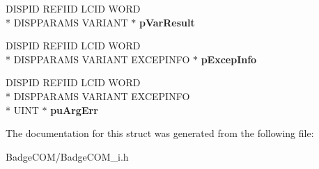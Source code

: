 \begin{DoxyCompactItemize}
\item 
\hypertarget{struct_i_badge_icon_syncing_vtbl_ad8247163aa51afda07ff140e0abb57e7}{D\-I\-S\-P\-I\-D R\-E\-F\-I\-I\-D L\-C\-I\-D W\-O\-R\-D \\*
D\-I\-S\-P\-P\-A\-R\-A\-M\-S V\-A\-R\-I\-A\-N\-T $\ast$ {\bfseries p\-Var\-Result}}\label{struct_i_badge_icon_syncing_vtbl_ad8247163aa51afda07ff140e0abb57e7}

\item 
\hypertarget{struct_i_badge_icon_syncing_vtbl_aaf1e9501546076d7383a806ce70d4faa}{D\-I\-S\-P\-I\-D R\-E\-F\-I\-I\-D L\-C\-I\-D W\-O\-R\-D \\*
D\-I\-S\-P\-P\-A\-R\-A\-M\-S V\-A\-R\-I\-A\-N\-T E\-X\-C\-E\-P\-I\-N\-F\-O $\ast$ {\bfseries p\-Excep\-Info}}\label{struct_i_badge_icon_syncing_vtbl_aaf1e9501546076d7383a806ce70d4faa}

\item 
\hypertarget{struct_i_badge_icon_syncing_vtbl_a9975e70578122879a7fee3cdcfd11344}{D\-I\-S\-P\-I\-D R\-E\-F\-I\-I\-D L\-C\-I\-D W\-O\-R\-D \\*
D\-I\-S\-P\-P\-A\-R\-A\-M\-S V\-A\-R\-I\-A\-N\-T E\-X\-C\-E\-P\-I\-N\-F\-O \\*
U\-I\-N\-T $\ast$ {\bfseries pu\-Arg\-Err}}\label{struct_i_badge_icon_syncing_vtbl_a9975e70578122879a7fee3cdcfd11344}

\end{DoxyCompactItemize}


The documentation for this struct was generated from the following file\-:\begin{DoxyCompactItemize}
\item 
Badge\-C\-O\-M/Badge\-C\-O\-M\-\_\-i.\-h\end{DoxyCompactItemize}
